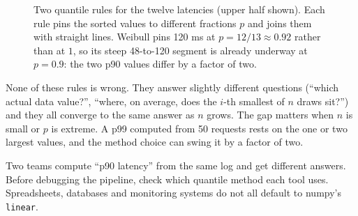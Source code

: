 \begin{figure}[H]
\centering
{}
\caption{Two quantile rules for the twelve latencies (upper half shown). Each rule pins the
sorted values to different fractions $p$ and joins them with straight lines. Weibull pins
120 ms at $p=12/13\approx0.92$ rather than at $1$, so its steep 48-to-120 segment is
already underway at $p=0.9$: the two p90 values differ by a factor of two.}
\label{fig:quantiles-methods-pos}
\end{figure}

None of these rules is wrong. They answer slightly different questions (``which actual
data value?'', ``where, on average, does the $i$-th smallest of $n$ draws sit?'') and
they all converge to the same answer as $n$ grows. The gap matters when $n$ is small or $p$ is
extreme. A p99 computed from 50 requests rests on the one or two largest values, and
the method choice can swing it by a factor of two.

\begin{trapbox}
Two teams compute ``p90 latency'' from the same log and get different answers. Before
debugging the pipeline, check which quantile method each tool uses. Spreadsheets,
databases and monitoring systems do not all default to numpy's \texttt{linear}.
\end{trapbox}

